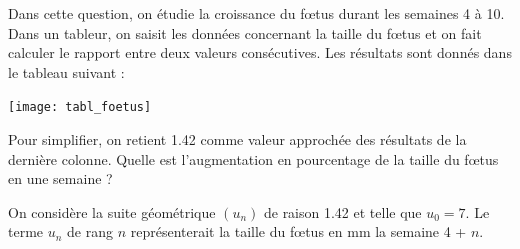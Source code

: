 \documentclass[a4paper,11pt]{exam}
\begin{document}
\begin{questions}
	\question[2] 
	
	\question[2]
		Dans cette question, on étudie la croissance du f\oe tus durant les semaines 4 à 10. Dans un tableur, on saisit les données concernant la taille du f\oe tus et on fait calculer le rapport entre deux valeurs consécutives.
		Les résultats sont donnés dans le tableau suivant :
		
		\begin{center}
			\texttt{[image: tabl\_foetus]}
		\end{center}
		
		Pour simplifier, on retient \num{1.42} comme valeur approchée des résultats de la dernière colonne. Quelle est l'augmentation en pourcentage de la taille du f\oe tus en une semaine ?
		
	\question[4]
		On considère la suite géométrique $(u_n)$ de raison \num{1.42} et telle que $u_0 = 7$. Le terme $u_n$ de rang $n$ représenterait la taille du f\oe tus en mm la semaine 4 + $n$.
\end{questions}




	\label{LastPage}
	
\end{document}
